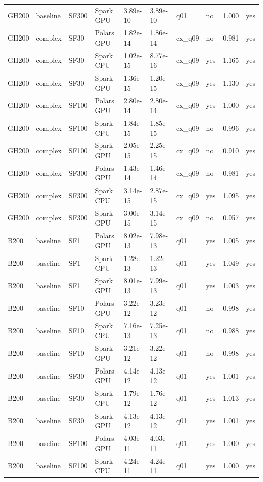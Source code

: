 \begin{longtable}{llllllllrl}
GH200 & baseline & SF300 & Spark GPU & 3.89e-10 & 3.89e-10 & q01 & no & 1.000 & yes \\
GH200 & complex & SF30 & Polars GPU & 1.82e-14 & 1.86e-14 & cx\_q09 & no & 0.981 & yes \\
GH200 & complex & SF30 & Spark CPU & 1.02e-15 & 8.77e-16 & cx\_q09 & yes & 1.165 & yes \\
GH200 & complex & SF30 & Spark GPU & 1.36e-15 & 1.20e-15 & cx\_q09 & yes & 1.130 & yes \\
GH200 & complex & SF100 & Polars GPU & 2.80e-14 & 2.80e-14 & cx\_q09 & yes & 1.000 & yes \\
GH200 & complex & SF100 & Spark CPU & 1.84e-15 & 1.85e-15 & cx\_q09 & no & 0.996 & yes \\
GH200 & complex & SF100 & Spark GPU & 2.05e-15 & 2.25e-15 & cx\_q09 & no & 0.910 & yes \\
GH200 & complex & SF300 & Polars GPU & 1.43e-14 & 1.46e-14 & cx\_q09 & no & 0.981 & yes \\
GH200 & complex & SF300 & Spark CPU & 3.14e-15 & 2.87e-15 & cx\_q09 & yes & 1.095 & yes \\
GH200 & complex & SF300 & Spark GPU & 3.00e-15 & 3.14e-15 & cx\_q09 & no & 0.957 & yes \\
B200 & baseline & SF1 & Polars GPU & 8.02e-13 & 7.98e-13 & q01 & yes & 1.005 & yes \\
B200 & baseline & SF1 & Spark CPU & 1.28e-13 & 1.22e-13 & q01 & yes & 1.049 & yes \\
B200 & baseline & SF1 & Spark GPU & 8.01e-13 & 7.99e-13 & q01 & yes & 1.003 & yes \\
B200 & baseline & SF10 & Polars GPU & 3.22e-12 & 3.23e-12 & q01 & no & 0.998 & yes \\
B200 & baseline & SF10 & Spark CPU & 7.16e-13 & 7.25e-13 & q01 & no & 0.988 & yes \\
B200 & baseline & SF10 & Spark GPU & 3.21e-12 & 3.22e-12 & q01 & no & 0.998 & yes \\
B200 & baseline & SF30 & Polars GPU & 4.14e-12 & 4.13e-12 & q01 & yes & 1.001 & yes \\
B200 & baseline & SF30 & Spark CPU & 1.79e-12 & 1.76e-12 & q01 & yes & 1.013 & yes \\
B200 & baseline & SF30 & Spark GPU & 4.13e-12 & 4.13e-12 & q01 & yes & 1.001 & yes \\
B200 & baseline & SF100 & Polars GPU & 4.03e-11 & 4.03e-11 & q01 & yes & 1.000 & yes \\
B200 & baseline & SF100 & Spark CPU & 4.24e-11 & 4.24e-11 & q01 & yes & 1.000 & yes \\

\end{longtable}
